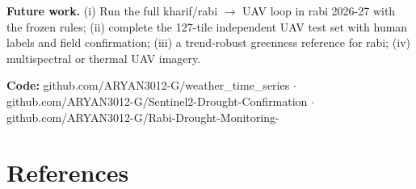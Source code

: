 \documentclass[11pt,a4paper,oneside]{article}
\begin{document}
\textbf{Future work.} (i) Run the full kharif/rabi $\rightarrow$ UAV loop in rabi 2026-27 with the frozen rules; (ii) complete the 127-tile independent UAV test set with human labels and field confirmation; (iii) a trend-robust greenness reference for rabi; (iv) multispectral or thermal UAV imagery.

\textbf{Code:} github.com/ARYAN3012-G/weather\_time\_series $\cdot$ github.com/ARYAN3012-G/Sentinel2-Drought-Confirmation $\cdot$ github.com/ARYAN3012-G/Rabi-Drought-Monitoring-

\section*{References}
\begingroup
\footnotesize
\setlength{\parskip}{0pt}
\renewcommand{\section}[2]{}
\end{document}
